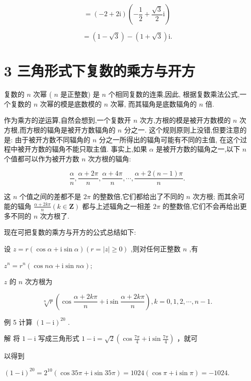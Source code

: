 \documentclass[10pt]{article}
\begin{document}
\[
= \left( {-2 + 2\mathrm{i}}\right) \left( {-\frac{1}{2} + \frac{\sqrt{3}}{2}\mathrm{i}}\right)
\]

\[
= \left( {1 - \sqrt{3}}\right)  - \left( {1 + \sqrt{3}}\right) \mathrm{i}.
\]

\section*{3 三角形式下复数的乘方与开方}

复数的 \(n\) 次幂 ( \(n\) 是正整数) 是 \(n\) 个相同复数的连乘,因此, 根据复数乘法公式,一个复数的 \(n\) 次幂的模是底数模的 \(n\) 次幂, 而其辐角是底数辐角的 \(n\) 倍.

作为乘方的逆运算,自然会想到,一个复数开 \(n\) 次方,方根的模是被开方数模的 \(n\) 次方根,而方根的辐角是被开方数辐角的 \(n\) 分之一. 这个规则原则上没错,但要注意的是: 由于被开方数不同辐角的 \(n\) 分之一所得出的辐角可能有不同的主值, 在这个过程中被开方数的辐角不能只取主值. 事实上,如果 \(\alpha\) 是被开方数的辐角之一,以下 \(n\) 个值都可以作为被开方数 \(n\) 次方根的辐角:

\[
\frac{\alpha }{n},\frac{\alpha  + {2\pi }}{n},\frac{\alpha  + {4\pi }}{n},\cdots ,\frac{\alpha  + 2\left( {n - 1}\right) \pi }{n}.
\]

这 \(n\) 个值之间的差都不是 \({2\pi }\) 的整数倍,它们都给出了不同的 \(n\) 次方根; 而其余可能的辐角 \(\frac{\alpha  + {2k\pi }}{n}\left( {k \in  \mathbf{Z}}\right)\) 都与上述辐角之一相差 \({2\pi }\) 的整数倍,它们不会再给出更多不同的 \(n\) 次方根了.

现在可把复数的乘方与开方的公式总结如下:

设 \(z = r\left( {\cos \alpha  + \mathrm{i}\sin \alpha }\right) \left( {r = \left| z\right|  \geq  0}\right)\) ,则对任何正整数 \(n\) ,有

\({z}^{n} = {r}^{n}\left( {\cos {n\alpha } + \mathrm{i}\sin {n\alpha }}\right) ;\)

\(z\) 的 \(n\) 次方根为

\[
\sqrt[n]{r}\left( {\cos \frac{\alpha  + {2k\pi }}{n} + \mathrm{i}\sin \frac{\alpha  + {2k\pi }}{n}}\right) ,k = 0,1,2,\cdots ,n - 1.
\]

例 5 计算 \({\left( 1 - \mathrm{i}\right) }^{20}\) .

解 将 \(1 - \mathrm{i}\) 写成三角形式 \(1 - \mathrm{i} = \sqrt{2}\left( {\cos \frac{7\pi }{4} + \mathrm{i}\sin \frac{7\pi }{4}}\right)\) ，就可

以得到

\({\left( 1 - \mathrm{i}\right) }^{20} = {2}^{10}\left( {\cos {35\pi } + \mathrm{i}\sin {35\pi }}\right)  = {1024}\left( {\cos \pi  + \mathrm{i}\sin \pi }\right)  =  - {1024}.\)
\end{document}
